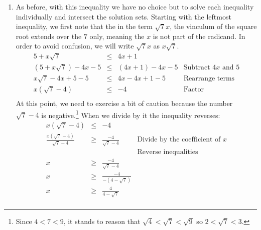 \documentclass{ximera}
\begin{document}
\begin{example}
\begin{enumerate}
\item As before, with this inequality  we have no choice but to solve each inequality individually and intersect the solution sets.  Starting with the leftmost inequality, we first note that the in the term $\sqrt{7} x$, the vinculum of the square root extends over the $7$ only, meaning the $x$ is not part of the radicand.  In order to avoid confusion, we will write $\sqrt{7} x$ as $x \sqrt{7}$.\[ \begin{array}{rclr}

5 + x\sqrt{7}  & \leq & 4x+1  & \\

(5 + x\sqrt{7} ) -4x  - 5 & \leq&  (4x + 1) - 4x - 5  & \text{Subtract $4x$ and $5$} \\

x\sqrt{7} - 4x + 5 - 5 & \leq & 4x - 4x + 1 - 5 & \text{Rearrange terms} \\

x(\sqrt{7} - 4) & \leq & -4 & \text{Factor} \\ \end{array} \] At this point, we need to exercise a bit of caution because the number $\sqrt{7} - 4$ is negative.\footnote{Since $4 < 7 < 9$, it stands to reason that $\sqrt{4} < \sqrt{7} < \sqrt{9}$ so $2 < \sqrt{7} < 3$.} When we divide by it the inequality reverses:\[ \begin{array}{rclr}

x(\sqrt{7} - 4) & \leq & -4 & \\ 

 \frac{x(\sqrt{7}-4)}{\sqrt{7}-4} & \geq &  \frac{-4}{\sqrt{7} - 4} & \text{Divide by the coefficient of $x$} \\ [-8pt]
                                  &      &                          & \text{Reverse inequalities} \\  

x & \geq &  \frac{-4}{\sqrt{7} - 4} & \\  

x & \geq &  \frac{-4}{-(4 - \sqrt{7})} &  \\  

x & \geq &  \frac{4}{4 -\sqrt{7}} & \\


\end{array}\]
\end{enumerate}
\end{example}
\end{document}
